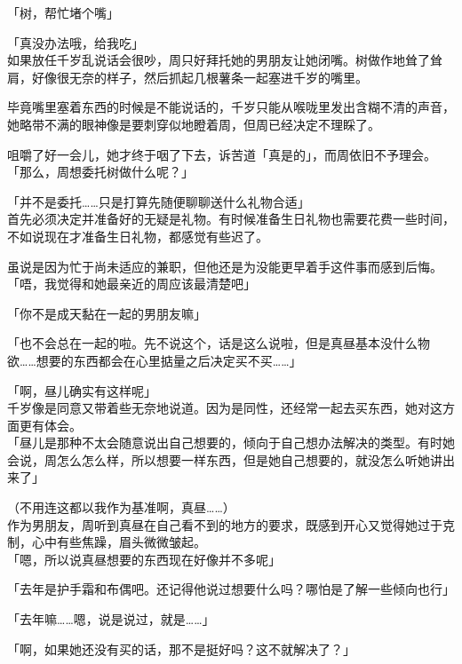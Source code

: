 「树，帮忙堵个嘴」

「真没办法哦，给我吃」\\

如果放任千岁乱说话会很吵，周只好拜托她的男朋友让她闭嘴。树做作地耸了耸肩，好像很无奈的样子，然后抓起几根薯条一起塞进千岁的嘴里。

毕竟嘴里塞着东西的时候是不能说话的，千岁只能从喉咙里发出含糊不清的声音，她略带不满的眼神像是要刺穿似地瞪着周，但周已经决定不理睬了。

咀嚼了好一会儿，她才终于咽了下去，诉苦道「真是的」，而周依旧不予理会。\\

「那么，周想委托树做什么呢？」

「并不是委托……只是打算先随便聊聊送什么礼物合适」\\

首先必须决定并准备好的无疑是礼物。有时候准备生日礼物也需要花费一些时间，不如说现在才准备生日礼物，都感觉有些迟了。

虽说是因为忙于尚未适应的兼职，但他还是为没能更早着手这件事而感到后悔。\\

「唔，我觉得和她最亲近的周应该最清楚吧」

「你不是成天黏在一起的男朋友嘛」

「也不会总在一起的啦。先不说这个，话是这么说啦，但是真昼基本没什么物欲……想要的东西都会在心里掂量之后决定买不买……」

「啊，昼儿确实有这样呢」\\

千岁像是同意又带着些无奈地说道。因为是同性，还经常一起去买东西，她对这方面更有体会。\\

「昼儿是那种不太会随意说出自己想要的，倾向于自己想办法解决的类型。有时她会说，周怎么怎么样，所以想要一样东西，但是她自己想要的，就没怎么听她讲出来了」

（不用连这都以我作为基准啊，真昼……）\\

作为男朋友，周听到真昼在自己看不到的地方的要求，既感到开心又觉得她过于克制，心中有些焦躁，眉头微微皱起。\\

「嗯，所以说真昼想要的东西现在好像并不多呢」

「去年是护手霜和布偶吧。还记得他说过想要什么吗？哪怕是了解一些倾向也行」

「去年嘛……嗯，说是说过，就是……」

「啊，如果她还没有买的话，那不是挺好吗？这不就解决了？」

